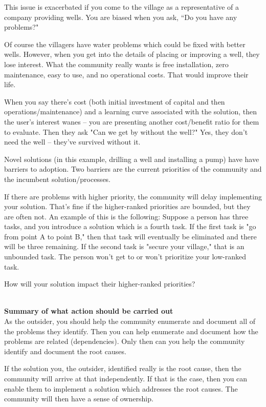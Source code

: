This issue is exacerbated if you come to the village as a representative of a company providing wells. You are biased when you ask, ``Do you have any problems?"

Of course the villagers have water problems which could be fixed with better wells. However, when you get into the details of placing or improving a well, they lose interest. What the community really wants is free installation, zero maintenance, easy to use, and no operational costs. That would improve their life.

When you say there's cost (both initial investment of capital and then operations/maintenance) and a learning curve associated with the solution, then the user's interest wanes -- you are presenting another cost/benefit ratio for them to evaluate. Then they ask "Can we get by without the well?" Yes, they don't need the well -- they've survived without it.

Novel solutions (in this example, drilling a well and installing a pump) have have barriers to adoption. Two barriers are the current priorities of the community and the incumbent solution/processes.

If there are problems with higher priority, the community will delay implementing your solution. That's fine if the higher-ranked priorities are bounded, but they are often not. An example of this is the following:
Suppose a person has three tasks, and you introduce a solution which is a fourth task.
If the first task is "go from point A to point B," then that task will eventually be eliminated and there will be three remaining.
If the second task is "secure your village," that is an unbounded task. The person won't get to or won't prioritize your low-ranked task.

How will your solution impact their higher-ranked priorities?

\ \\

\textbf{Summary of what action should be carried out} \\

As the outsider, you should help the community enumerate and document all of the problems they identify. Then you can help enumerate and document how the problems are related (dependencies). Only then can you help the community identify and document the root causes.

If the solution you, the outsider, identified really is the root cause, then the community will arrive at that independently. If that is the case, then you can enable them to implement a solution which addresses the root causes. The community will then have a sense of ownership.
